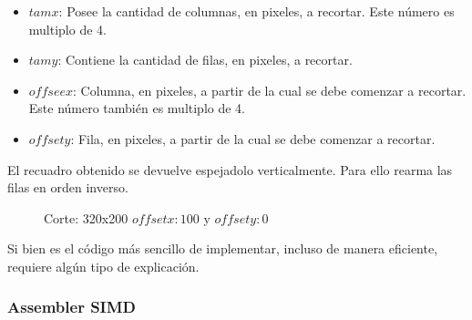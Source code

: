 \begin{itemize}
\item{$tamx$: Posee la cantidad de columnas, en pixeles, a recortar. Este número es multiplo de 4.}
\item{$tamy$: Contiene la cantidad de filas, en pixeles, a recortar.}
\item{$offseex$: Columna, en pixeles, a partir de la cual se debe comenzar a recortar. Este número también es multiplo de 4.}
\item{$offsety$: Fila, en pixeles, a partir de la cual se debe comenzar a recortar.}
\end{itemize}

El recuadro obtenido se devuelve espejadolo verticalmente. Para ello rearma las filas en orden inverso.\\

\newpage

\begin{figure}
  \centering
  \hfill
  \caption{Corte: 320x200 $offset x: 100$ y $offset y: 0$}
\end{figure}

Si bien es el código más sencillo de implementar, incluso de manera eficiente, requiere algún tipo de explicación.

\subsubsection{Assembler SIMD}

